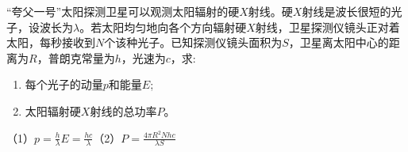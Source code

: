 “夸父一号”太阳探测卫星可以观测太阳辐射的硬\(X\)射线。硬\(X\)射线是波长很短的光子，设波长为\(\lambda\)。若太阳均匀地向各个方向辐射硬\(X\)射线，卫星探测仪镜头正对着太阳，每秒接收到\(N\)个该种光子。已知探测仪镜头面积为\(S\)，卫星离太阳中心的距离为\(R\)，普朗克常量为\(h\)，光速为\(c\)，求:
\begin{enumerate}
	\item 每个光子的动量\(p\)和能量\(E\);
	\item 太阳辐射硬\(X\)射线的总功率\(P\)。
\end{enumerate}
\begin{answer}
    （1）\(p = \frac{h}{\lambda}\)\quad \(E = \frac{hc}{\lambda}\)（2）\(P = \frac{4\pi R^2Nhc}{\lambda S}\)
\end{answer}